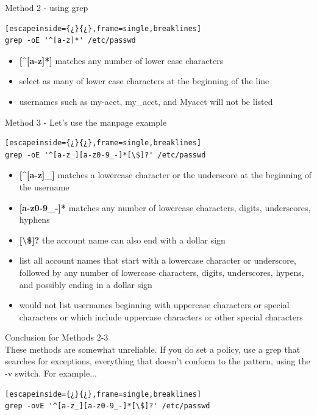 Method 2 - using grep

\begin{lstlisting}[escapeinside={¿}{¿},frame=single,breaklines]
grep -oE '^[a-z]*' /etc/passwd
\end{lstlisting}

\begin{itemize}
	\item \textbf{[\textasciicircum{}[a-z]*]} matches any number of lower case characters
	\item {} select as many of lower case characters at the beginning of the line
	\item {} usernames such as my-acct, my\_acct, and Myacct will not be listed
\end{itemize}

Method 3 - Let's use the manpage example

\begin{lstlisting}[escapeinside={¿}{¿},frame=single,breaklines]
grep -oE '^[a-z_][a-z0-9_-]*[\$]?' /etc/passwd
\end{lstlisting}

\begin{itemize}
	\item \textbf{[\textasciicircum{}[a-z]\_]} matches a lowercase character or the underscore at the beginning of the username
	\item \textbf{[a-z0-9\_-]*} matches any number of lowercase characters, digits, underscores, hyphens
	\item \textbf{[\textbackslash{}\$]?} the account name can also end with a dollar sign
	\item {} list all account names that start with a lowercase character or underscore, followed by any number of lowercase characters, digits, underscores, hypens, and possibly ending in a dollar sign
	\item {} would not list usernames beginning with uppercase characters or special characters or which include uppercase characters or other special characters
\end{itemize}

Conclusion for Methods 2-3\\

These methods are somewhat unreliable. If you do set a policy, use a grep that searches for exceptions, everything that doesn't conform to the pattern, using the -v switch. For example...

\begin{lstlisting}[escapeinside={¿}{¿},frame=single,breaklines]
grep -ovE '^[a-z_][a-z0-9_-]*[\$]?' /etc/passwd
\end{lstlisting}

